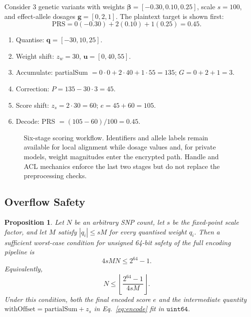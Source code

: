 \documentclass[10pt,twocolumn]{article}
\newtheorem{proposition}{Proposition}
\begin{document}
Consider 3 genetic variants with weights $\boldsymbol{\beta} = [-0.30, 0.10, 0.25]$, scale
$s = 100$, and effect-allele dosages $\mathbf{g} = [0, 2, 1]$.  The plaintext
target is shown first:
\[
\mathrm{PRS}=0(-0.30)+2(0.10)+1(0.25)=0.45.
\]

\begin{enumerate}
  \item Quantise: $\mathbf{q} = [-30, 10, 25]$.
  \item Weight shift: $z_w = 30$, $\mathbf{u} = [0, 40, 55]$.
  \item Accumulate: partialSum $= 0{\cdot}0 + 2{\cdot}40 + 1{\cdot}55 = 135$;
        $G = 0 + 2 + 1 = 3$.
  \item Correction: $P = 135 - 30{\cdot}3 = 45$.
  \item Score shift: $z_s = 2{\cdot}30 = 60$; $e = 45 + 60 = 105$.
  \item Decode: PRS $= (105 - 60) / 100 = 0.45$.
\end{enumerate}

\begin{figure}[t]
\centering
{}
\caption{Six-stage scoring workflow.  Identifiers and allele labels remain available
for local alignment while dosage values and, for private models, weight magnitudes enter
the encrypted path.  Handle and ACL mechanics enforce the last two stages but do not
replace the preprocessing checks.}
\label{fig:scoring_workflow}
\end{figure}

\subsection{Overflow Safety}
\label{sec:overflow}

\begin{proposition}
Let $N$ be an arbitrary SNP count, let $s$ be the fixed-point scale factor, and
let $M$ satisfy $|q_i| \leq sM$ for every quantised weight $q_i$.  Then a
sufficient worst-case condition for unsigned 64-bit safety of the full encoding
pipeline is
\[
4 s M N \leq 2^{64} - 1.
\]
Equivalently,
\[
N \leq \left\lfloor \frac{2^{64} - 1}{4 s M} \right\rfloor.
\]
Under this condition, both the final encoded score $e$ and the intermediate
quantity $\mathrm{withOffset} = \mathrm{partialSum} + z_s$ in
Eq.~\ref{eq:encode} fit in $\texttt{uint64}$.
\end{proposition}
\end{document}
